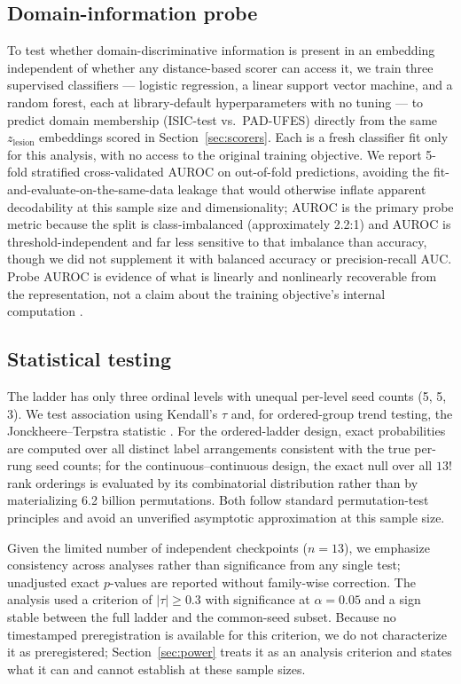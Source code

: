 \subsection{Domain-information probe}
\label{sec:probe}

To test whether domain-discriminative information is present in an embedding independent of whether any distance-based scorer can access it, we train three supervised classifiers --- logistic regression, a linear support vector machine, and a random forest, each at library-default hyperparameters with no tuning --- to predict domain membership (ISIC-test vs.\ PAD-UFES) directly from the same $z_{\mathrm{lesion}}$ embeddings scored in Section~\ref{sec:scorers}. Each is a fresh classifier fit only for this analysis, with no access to the original training objective. We report 5-fold stratified cross-validated AUROC on out-of-fold predictions, avoiding the fit-and-evaluate-on-the-same-data leakage that would otherwise inflate apparent decodability at this sample size and dimensionality; AUROC is the primary probe metric because the split is class-imbalanced (approximately 2.2:1) and AUROC is threshold-independent and far less sensitive to that imbalance than accuracy, though we did not supplement it with balanced accuracy or precision-recall AUC. Probe AUROC is evidence of what is linearly and nonlinearly recoverable from the representation, not a claim about the training objective's internal computation \citep{hewitt2019designing}.

\subsection{Statistical testing}
\label{sec:stats}

The ladder has only three ordinal levels with unequal per-level seed counts (5, 5, 3). We test association using Kendall's $\tau$ and, for ordered-group trend testing, the Jonckheere--Terpstra statistic \citep{terpstra1952asymptotic, jonckheere1954distribution}. For the ordered-ladder design, exact probabilities are computed over all distinct label arrangements consistent with the true per-rung seed counts; for the continuous--continuous design, the exact null over all $13!$ rank orderings is evaluated by its combinatorial distribution rather than by materializing 6.2 billion permutations. Both follow standard permutation-test principles \citep{good2005permutation} and avoid an unverified asymptotic approximation at this sample size.

Given the limited number of independent checkpoints ($n = 13$), we emphasize consistency across analyses rather than significance from any single test; unadjusted exact $p$-values are reported without family-wise correction. The analysis used a criterion of $|\tau| \geq 0.3$ with significance at $\alpha = 0.05$ and a sign stable between the full ladder and the common-seed subset. Because no timestamped preregistration is available for this criterion, we do not characterize it as preregistered; Section~\ref{sec:power} treats it as an analysis criterion and states what it can and cannot establish at these sample sizes.

